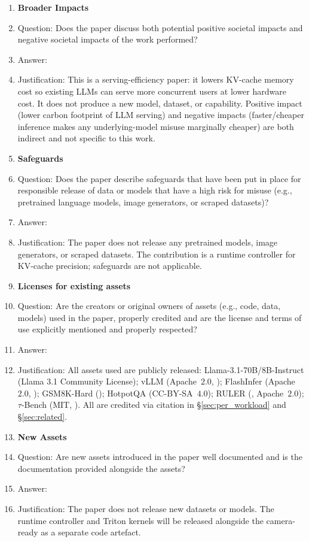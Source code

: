 \documentclass{article}
\begin{document}
\begin{enumerate}
\item {\bf Broader Impacts}
\item[] Question: Does the paper discuss both potential positive societal impacts and negative societal impacts of the work performed?
\item[] Answer: \answerNA{}
\item[] Justification: This is a serving-efficiency paper: it lowers KV-cache memory cost so existing LLMs can serve more concurrent users at lower hardware cost. It does not produce a new model, dataset, or capability. Positive impact (lower carbon footprint of LLM serving) and negative impacts (faster/cheaper inference makes any underlying-model misuse marginally cheaper) are both indirect and not specific to this work.

\item {\bf Safeguards}
\item[] Question: Does the paper describe safeguards that have been put in place for responsible release of data or models that have a high risk for misuse (e.g., pretrained language models, image generators, or scraped datasets)?
\item[] Answer: \answerNA{}
\item[] Justification: The paper does not release any pretrained models, image generators, or scraped datasets. The contribution is a runtime controller for KV-cache precision; safeguards are not applicable.

\item {\bf Licenses for existing assets}
\item[] Question: Are the creators or original owners of assets (e.g., code, data, models) used in the paper, properly credited and are the license and terms of use explicitly mentioned and properly respected?
\item[] Answer: \answerYes{}
\item[] Justification: All assets used are publicly released: Llama-3.1-70B/8B-Instruct (Llama 3.1 Community License); vLLM (Apache~$2.0$, \cite{kwon2023vllm}); FlashInfer (Apache~$2.0$, \cite{ye2025flashinfer}); GSM8K-Hard (\cite{gsmhard}); HotpotQA (CC-BY-SA~$4.0$); RULER (\cite{hsieh2024ruler}, Apache~$2.0$); $\tau$-Bench (MIT, \cite{yao2024taubench}). All are credited via citation in \S\ref{sec:per_workload} and \S\ref{sec:related}.

\item {\bf New Assets}
\item[] Question: Are new assets introduced in the paper well documented and is the documentation provided alongside the assets?
\item[] Answer: \answerNA{}
\item[] Justification: The paper does not release new datasets or models. The runtime controller and Triton kernels will be released alongside the camera-ready as a separate code artefact.


\end{enumerate}
\end{document}
